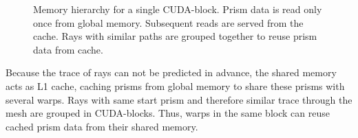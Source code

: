 \begin{figure}[H]
  \centerline
      {}
  \caption{Memory hierarchy for a single CUDA-block. Prism data is read
    only once from global memory. Subsequent reads are served from the
    cache. Rays with similar paths are grouped together to reuse prism data
    from cache.}
  \label{graphic:memory_hierarchy}
\end{figure}
Because the trace of rays can not be predicted in advance, the shared
memory acts as L1 cache, caching prisms from global memory to share
these prisms with several warps.  Rays with same start prism and
therefore similar trace through the mesh are grouped in
CUDA-blocks. Thus, warps in the same block can reuse cached prism data
from their shared memory.

